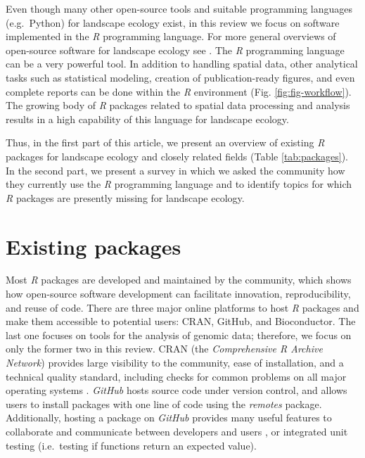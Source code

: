 \documentclass[smallextended]{svjour3}       %
\begin{document}
Even though many other open-source tools \cite{QGISDevelopmentTeam2016,GRASSDevelopmentTeam2017,Porta2017} and suitable programming languages (e.g.~Python) for landscape ecology exist, in this review we focus on software implemented in the \emph{R} programming language.
For more general overviews of open-source software for landscape ecology see \cite{Jolma2008,Steiniger2009,Steiniger2009a,Istvan2012}.
The \emph{R} programming language can be a very powerful tool. In addition to handling spatial data, other analytical tasks such as statistical modeling, creation of publication-ready figures, and even complete reports can be done within the \emph{R} environment (Fig. \ref{fig:fig-workflow}).
The growing body of \emph{R} packages related to spatial data processing and analysis results in a high capability of this language for landscape ecology.

Thus, in the first part of this article, we present an overview of existing \emph{R} packages for landscape ecology and closely related fields (Table \ref{tab:packages}).
In the second part, we present a survey in which we asked the community how they currently use the \emph{R} programming language and to identify topics for which \emph{R} packages are presently missing for landscape ecology.

\hypertarget{sec:existing_packages}{%
\section{Existing packages}\label{sec:existing_packages}}

Most \emph{R} packages are developed and maintained by the community, which shows how open-source software development can facilitate innovation, reproducibility, and reuse of code.
There are three major online platforms to host \emph{R} packages and make them accessible to potential users: CRAN, GitHub, and Bioconductor.
The last one focuses on tools for the analysis of genomic data; therefore, we focus on only the former two in this review.
CRAN (the \emph{Comprehensive R Archive Network}) provides large visibility to the community, ease of installation, and a technical quality standard, including checks for common problems on all major operating systems \cite{Wickham2015}.
\emph{GitHub} hosts source code under version control, and allows users to install packages with one line of code using the \emph{remotes} \cite{Hester2020} package.
Additionally, hosting a package on \emph{GitHub} provides many useful features to collaborate and communicate between developers and users \cite{Wickham2015}, or integrated unit testing (i.e.~testing if functions return an expected value).
\end{document}
